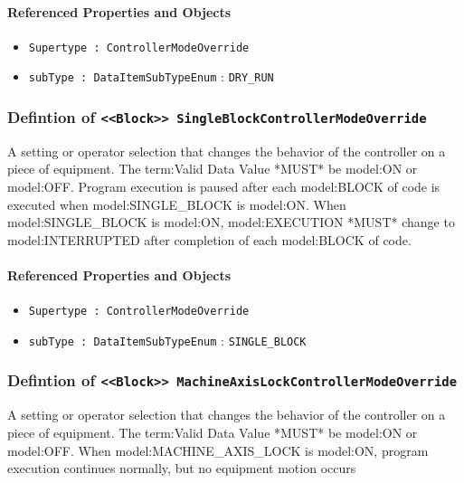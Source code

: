 \FloatBarrier
\paragraph{Referenced Properties and Objects}

\begin{itemize}
\item \texttt{Supertype : ControllerModeOverride}

\item \texttt{subType : DataItemSubTypeEnum} : \texttt{DRY_RUN}

\end{itemize}
\FloatBarrier
\subsubsection{Defintion of \texttt{<<Block>> SingleBlockControllerModeOverride}}
  \label{type:SingleBlockControllerModeOverride}

\FloatBarrier

A setting or operator selection that changes the behavior of the controller on a piece of equipment. 
 The {term:Valid Data Value} *MUST* be {model:ON} or {model:OFF}.
 Program execution is paused after each {model:BLOCK} of code is executed when {model:SINGLE_BLOCK} is {model:ON}.   
 When {model:SINGLE_BLOCK} is {model:ON}, {model:EXECUTION} *MUST* change to {model:INTERRUPTED} after completion of each {model:BLOCK} of code. 

\FloatBarrier
\paragraph{Referenced Properties and Objects}

\begin{itemize}
\item \texttt{Supertype : ControllerModeOverride}

\item \texttt{subType : DataItemSubTypeEnum} : \texttt{SINGLE_BLOCK}

\end{itemize}
\FloatBarrier
\subsubsection{Defintion of \texttt{<<Block>> MachineAxisLockControllerModeOverride}}
  \label{type:MachineAxisLockControllerModeOverride}

\FloatBarrier

A setting or operator selection that changes the behavior of the controller on a piece of equipment. 
 The {term:Valid Data Value} *MUST* be {model:ON} or {model:OFF}. 
 When {model:MACHINE_AXIS_LOCK} is {model:ON}, program execution continues normally, but no equipment motion occurs 

